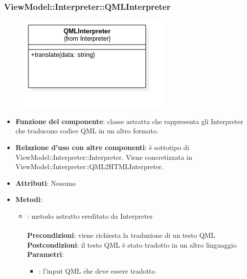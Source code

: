 \subsubsection{ViewModel::Interpreter::QMLInterpreter}
\begin{figure}[h!]
\begin{center}
	\includegraphics[scale=0.4]{../images/ViewModel/Interpreter/QMLInterpreter.png}
\end{center}
\end{figure}
\begin{itemize}
\item\textbf{Funzione del componente}: classe astratta che rappresenta gli Interpreter che traducono codice QML in un altro formato.
	\item\textbf{Relazione d'uso con altre componenti}: è sottotipo di ViewModel::Interpreter::Interpreter. Viene concretizzata in ViewModel::Interpreter::QML2HTMLInterpreter.\\ 
\item\textbf{Attributi}: Nessuno
\item\textbf{Metodi}:
	\begin{itemize}
		\item{}: metodo astratto ereditato da Interpreter\\\\
		\textbf{Precondizioni}: viene richiesta la traduzione di un testo QML\\
		\textbf{Postcondizioni}: il testo QML è stato tradotto in un altro linguaggio\\
		\textbf{Parametri}:
			\begin{itemize}
				\item{}: l'input QML che deve essere tradotto \\
			\end{itemize}
	\end{itemize}
\end{itemize}

